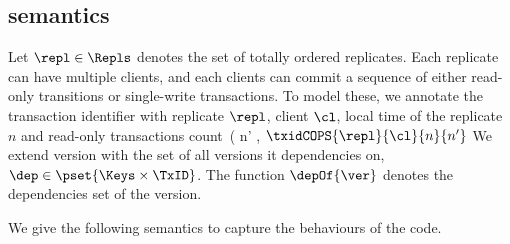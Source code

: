 \subsection{semantics}
Let \( \repl \in \Repls \) denotes the set of totally ordered replicates.
Each replicate can have multiple clients, and 
each clients can commit a sequence of either read-only transitions or single-write transactions.
To model these, we annotate the transaction identifier with replicate \( \repl \), client \( \cl \), 
local time of the replicate \( n \) and read-only transactions count\ ( n' \), \ie \( \txidCOPS{\repl}{\cl}{n}{n'} \)
We extend version with the set of all versions it dependencies on, \( \dep \in \pset{\Keys \times \TxID} \).
The function \( \depOf{\ver} \) denotes the dependencies set of the version.

We give the following semantics to capture the behaviours of the code.
